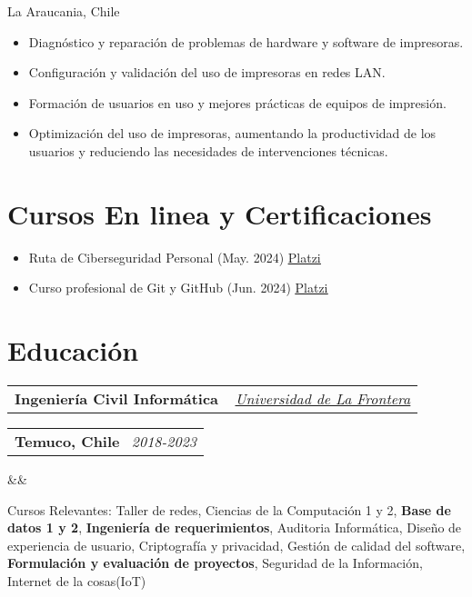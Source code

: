 \documentclass[11pt,a4paper,sans]{moderncv}
\makeatletter
\newcommand{\sectionMargin}{-3mm}
\newcommand*{\customcventry}[7][.13em]{
    \begin{tabular}{@{}l}
    {\bfseries #4} \
    {\itshape #3}
    \end{tabular}
    \hfill
    \begin{tabular}{l@{}}
    {\bfseries #5} \
    {\itshape #2}
    \end{tabular}
    \ifx&#7&%
    \else{\
    \begin{minipage}{\maincolumnwidth}%
    \small#7%
    \end{minipage}}\fi%
    \par\addvspace{#1}
}
\makeatother
\begin{document}
{    {La Araucania, Chile}{}
    {{\begin{itemize}[leftmargin=0.6cm, noitemsep, label={\textbullet}]
        \item Diagnóstico y reparación de problemas de hardware y software de impresoras.
        \item Configuración y validación del uso de impresoras en redes LAN.
        \item Formación de usuarios en uso y mejores prácticas de equipos de impresión.
        \item Optimización del uso de impresoras, aumentando la productividad de los usuarios y reduciendo las necesidades de intervenciones técnicas.
    \end{itemize}}
}
}

\vspace*{\sectionMargin}

\section{Cursos En linea y Certificaciones}{
\begin{itemize}[label=\textbullet, noitemsep]
    \item Ruta de Ciberseguridad Personal (May. 2024) \href{https://1drv.ms/b/c/13c8ae619d64655e/EZYaMe6SBhJAshtvq4ORCQoBwWMYRerI4_xiuqXjORVd0w?e=I4tLqg}{\underline{Platzi}}
    \item Curso profesional de Git y GitHub (Jun. 2024) \href{https://1drv.ms/b/c/13c8ae619d64655e/EXeQGPrTCjFDpmx8pCItVTwB-OS1r-tkKJbmgYnahuxtYg?e=mc9YcH}{\underline{Platzi}}
\end{itemize}
}

\vspace*{-6mm}

\section{Educación}{
\customcventry
    {2018-2023}
    { \href{https://1drv.ms/b/c/13c8ae619d64655e/EV5lZJ1hrsgggBOHLAAAAAABHh9OZUbWLd2nx7PTa_OSsg?e=Fedmge}{\underline{Universidad de La Frontera}} }
    {Ingeniería Civil Informática}
    {Temuco, Chile}
    {}{}
    {Cursos Relevantes: 
        {Taller de redes}, 
        {Ciencias de la Computación} 1 y 2, 
        \textbf{Base de datos 1 y 2}, 
        \textbf{Ingeniería de requerimientos},
        {Auditoria Informática}, 
        {Diseño de experiencia de usuario}, 
        {Criptografía y privacidad}, 
        Gestión de {calidad del software}, 
        \textbf{Formulación y evaluación de proyectos},
        {Seguridad de la Información},
        Internet de la cosas{(IoT)}
}
}
\end{document}
